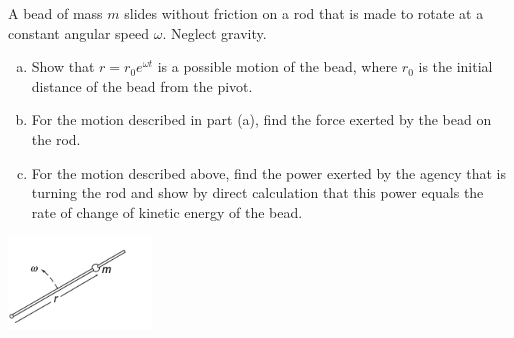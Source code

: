 \documentclass[12pt,letterpaper]{hmcpset}
\begin{document}
\begin{problem}
    A bead of mass $m$ slides without friction
    on a rod that is made to rotate at a constant
    angular speed $\omega$. Neglect gravity.
    \begin{enumerate}[(a)]
    \item Show that $r = r_{0} e^{\omega t}$ is a 
        possible motion of the bead, where $r_{0}$ 
        is the initial distance of the bead from the 
        pivot.
    \item For the motion described in part (a), find 
        the force exerted by the bead on the rod.
    \item For the motion described above, find the 
        power exerted by the agency that is turning 
        the rod and show by direct calculation that
        this power equals the rate of change of kinetic
        energy of the bead.
    \end{enumerate}

    \begin{center}
        \includegraphics[width=1.5in]{img/7_22}
    \end{center}
\end{problem}

\begin{solution}
    \vfill
\end{solution}
\clearpage
\end{document}
